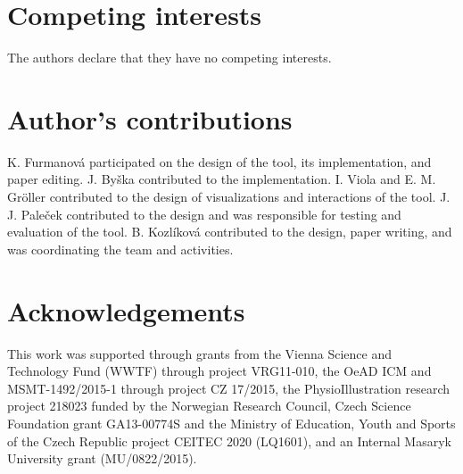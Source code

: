 \documentclass{bmcart}
\begin{document}
\begin{backmatter}

\section*{Competing interests}
  The authors declare that they have no competing interests.

\section*{Author's contributions}
K. Furmanov\'{a} participated on the design of the tool, its implementation, and paper editing.  J. By\v{s}ka contributed to the implementation. I. Viola and E. M. Gr\"{o}ller contributed to the design of visualizations and interactions of the tool. J. J. Pale\v{c}ek contributed to the design and was responsible for testing and evaluation of the tool. B. Kozl\'{i}kov\'{a} contributed to the design, paper writing, and was coordinating the team and activities.

\section*{Acknowledgements}
This work was supported through grants from the Vienna Science and Technology Fund (WWTF) through project VRG11-010, the OeAD ICM and MSMT-1492/2015-1 through project CZ 17/2015, the PhysioIllustration research project 218023 funded by the Norwegian Research Council,  Czech Science Foundation grant GA13-00774S and the Ministry of Education, Youth and Sports of the Czech Republic project CEITEC 2020 (LQ1601), and an Internal Masaryk University grant (MU/0822/2015).


\end{backmatter}
\end{document}
